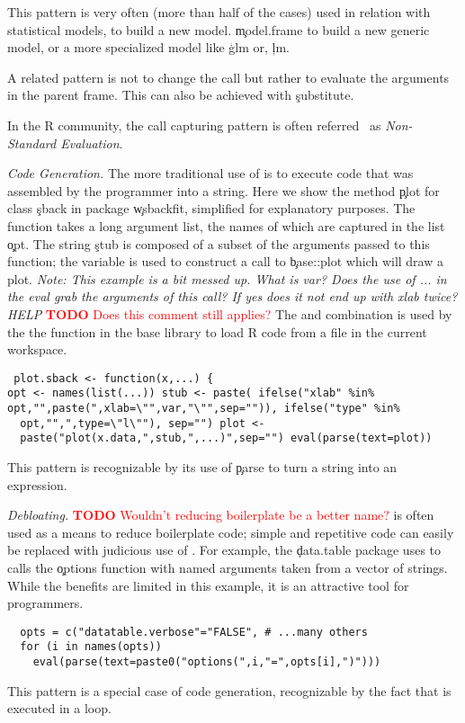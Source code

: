 \documentclass[screen,acmsmall]{acmart}
\newcommand{\mypara}[1]{\medskip\noindent\emph{#1}\xspace}
\newcommand{\NOTE}[1]{{\it Note: #1}\xspace}
\newcommand{\authorcomment}[3]{\xspace\textcolor{#1}{{\bf #2} #3}\xspace}
\newcommand{\todo}[1]{\authorcomment{red}{TODO}{#1}}
\begin{document}
This pattern is very often (more than half of the cases) used in relation with statistical models, to build a new model. \c{model.frame} to build a new generic model, or a more specialized model like \c{glm} or, \c{lm}.

A related pattern is not to change the call but rather to evaluate the arguments in the parent frame. This can also be achieved with \c{substitute}.

In the R community, the call capturing pattern is often referred~\cite{hadley} as \emph{Non-Standard Evaluation}.

\mypara{Code Generation.} The more traditional use of \eval is to execute code
that was assembled by the programmer into a string. Here we show the method
\c{plot} for class \c{sback} in package \c{wsbackfit}, simplified for
explanatory purposes. The function takes a long argument list, the names of
which are captured in the list \c{opt}. The string \c{stub} is composed of a
subset of the arguments passed to this function; the variable is used to
construct a call to \c{base::plot} which will draw a plot. \NOTE{This example
  is a bit messed up. What is var? Does the use of ... in the eval grab the
arguments of this call? If yes does it not end up with xlab twice? HELP}
\todo{Does this comment still applies?} The \parse and \eval combination is
used by the the \source function in the base library to load R code from a file
in the current workspace.  \begin{lstlisting} plot.sback <- function(x,...) {
opt <- names(list(...)) stub <- paste( ifelse("xlab" %in%
opt,"",paste(",xlab=\"",var,"\"",sep="")), ifelse("type" %in%
  opt,"",",type=\"l\""), sep="") plot <-
  paste("plot(x.data,",stub,",...)",sep="") eval(parse(text=plot))
  \end{lstlisting} This pattern is recognizable by its use of \c{parse} to turn
  a string into an expression.


\mypara{Debloating.} \todo{Wouldn't reducing boilerplate be a better name?} \Eval is often used as a means to reduce boilerplate code;
simple and repetitive code can easily be replaced with judicious use of \eval.
For example, the \c{data.table} package uses \eval to calls the \c{options}
function with named arguments taken from a vector of strings. While the benefits
are limited in this example, it is an attractive tool for programmers.
\begin{lstlisting}
  opts = c("datatable.verbose"="FALSE", # ...many others
  for (i in names(opts))
    eval(parse(text=paste0("options(",i,"=",opts[i],")")))
\end{lstlisting}
This pattern is a special case of code generation, recognizable by the
fact that \eval is executed in a loop.
\end{document}
